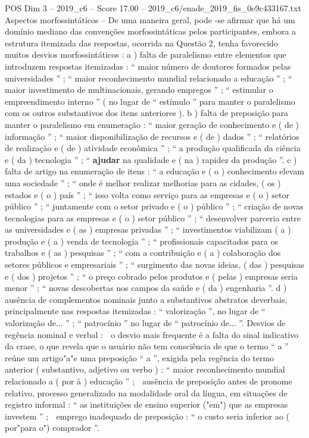 \begin{textsample}{POS Dim 3 – 2019\_c6 – Score 17.00 – 2019\_c6/enade\_2019\_fis\_0e9c433167.txt}
Aspectos morfossintáticos – De uma maneira geral, pode -se afirmar que há um domínio mediano das convenções morfossintáticas pelos participantes, embora a estrutura itemizada das respostas, ocorrida na Questão 2, tenha favorecido muitos desvios morfossintáticos : a ) falta de paralelismo entre elementos que introduzem respostas itemizadas : “ maior número de doutores formados pelas universidades ” ; “ maior reconhecimento mundial relacionado a educação ” ; “ maior investimento de multinacionais, gerando empregos ” ; “ estimular o empreendimento interno ” ( no lugar de “ estímulo ” para manter o paralelismo com os outros substantivos dos itens anteriores ). b ) falta de preposição para manter o paralelismo em enumeração : “ maior geração de conhecimento e ( de ) informação ” ; “ maior disponibilização de recursos e ( de ) dados ” ; “ relatórios de realização e ( de ) atividade econômica ” ; “ a produção qualificada da ciência e ( da ) tecnologia ” ; “ \textbf{ajudar} na qualidade e ( na ) rapidez da produção ”. c ) falta de artigo na enumeração de itens : “ a educação e ( o ) conhecimento elevam uma sociedade ” ; “ onde é melhor realizar melhorias para as cidades, ( os ) estados e ( o ) país ” ; “ isso volta como serviço para as empresas e ( o ) setor público ” ; “ juntamente com o setor privado e ( o ) público ” ; “ criação de novas tecnologias para as empresas e ( o ) setor público ” ; “ desenvolver parceria entre as universidades e ( as ) empresas privadas ” ; “ investimentos viabilizam ( a ) produção e ( a ) venda de tecnologia ” ; “ profissionais capacitados para os trabalhos e ( as ) pesquisas ” ; “ com a contribuição e ( a ) colaboração dos setores públicos e empresariais ” ; “ surgimento das novas ideias, ( das ) pesquisas e ( dos ) projetos ” ; “ o preço cobrado pelos produtos e ( pelas ) empresas seria menor ” ; “ novas descobertas nos campos da saúde e ( da ) engenharia ”. d ) ausência de complementos nominais junto a substantivos abstratos deverbais, principalmente nas respostas itemizadas : “ valorização ”, no lugar de “ valorização de... ” ; “ patrocínio ” no lugar de “ patrocínio de... ”.
Desvios de regência nominal e verbal :  o desvio mais frequente é a falta do sinal indicativo da crase, o que revela que o usuário não tem consciência de que o termo “ a ” reúne um artigo"a"e uma preposição “ a ”, exigida pela regência do termo anterior ( substantivo, adjetivo ou verbo ) : “ maior reconhecimento mundial relacionado a ( por à ) educação ” ;  ausência de preposição antes de pronome relativo, processo generalizado na modalidade oral da língua, em situações de registro informal : “ as instituições de ensino superior ("em") que as empresas investem ” ;  emprego inadequado de preposição : “ o custo seria inferior ao ( por"para o") comprador ”.

\end{textsample}
